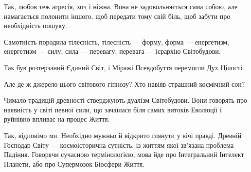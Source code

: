 Так, любов теж агресія, хоч і ніжна. Вона не задовольняється сама собою, але
намагається полонити іншого, щоб передати тому свій біль, щоб забути про
необхідність пошуку.

Самотність породила тілесність, тілесність — форму, форма — енергетизм,
енергетизм — силу, сила — перевагу, перевага — ієрархію Світобудови.

Так був розтерзаний Єдиний Світ, і Міражі Псевдобуття перемогли Дух Цілості.

Але де ж джерело цього світового гіпнозу? Хто навіяв страшний космічний сон?

Чимало традицій древності стверджують дуалізм Світобудови. Вони говорять про
наявність у світі певної сили, що зачаїлася біля самих витоків Еволюції і
руйнівно впливає на процес Життя.

Так, відповімо ми. Необхідно мужньо й відкрито глянути у вічі правді. Древній
Господар Світу — космоісторична сутність, із життям якої зв’язана проблема
Падіння. Говорячи сучасною термінологією, мова йде про Інтегральний Інтелект
Планети, або про Супермозок Біосфери Життя.

